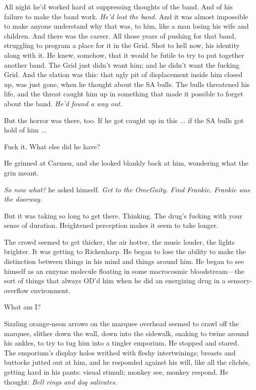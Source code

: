 All night he'd worked hard at suppressing thoughts of the band. And of his failure to make the band work. \textit{He'd lost the band.} And it was almost impossible to make anyone understand why that was, to him, like a man losing his wife and children. And there was the career. All those years of pushing for that band, struggling to program a place for it in the Grid. Shot to hell now, his identity along with it. He knew, somehow, that it would be futile to try to put together another band. The Grid just didn't want him; and he didn't want the fucking Grid. And the elation was this: that ugly pit of displacement inside him closed up, was just gone, when he thought about the SA bulls. The bulls threatened his life, and the threat caught him up in something that made it possible to forget about the band. \textit{He'd found a way out.}

But the horror was there, too. If he got caught up in this ... if the SA bulls got hold of him ...

Fuck it. What else did he have?

He grinned at Carmen, and she looked blankly back at him, wondering what the grin meant.

\textit{So now what?} he asked himself. \textit{Get to the OmeGaity. Find Frankie. Frankie was the doorway.}

But it was taking so long to get there. Thinking. The drug's fucking with your sense of duration. Heightened perception makes it seem to take longer.

The crowd seemed to get thicker, the air hotter, the music louder, the lights brighter. It was getting to Rickenharp. He began to lose the ability to make the distinction between things in his mind and things around him. He began to see himself as an enzyme molecule floating in some macrocosmic bloodstream---the sort of things that always OD'd him when he did an energizing drug in a sensory-overflow environment.

What am I?

Sizzling orange-neon arrows on the marquee overhead seemed to crawl off the marquee, slither down the wall, down into the sidewalk, snaking to twine around his ankles, to try to tug him into a tingler emporium. He stopped and stared. The emporium's display holos writhed with fleshy intertwinings; breasts and buttocks jutted out at him, and he responded against his will, like all the clichés, getting hard in his pants: visual stimuli; monkey see, monkey respond. He thought: \textit{Bell rings and dog salivates.}

